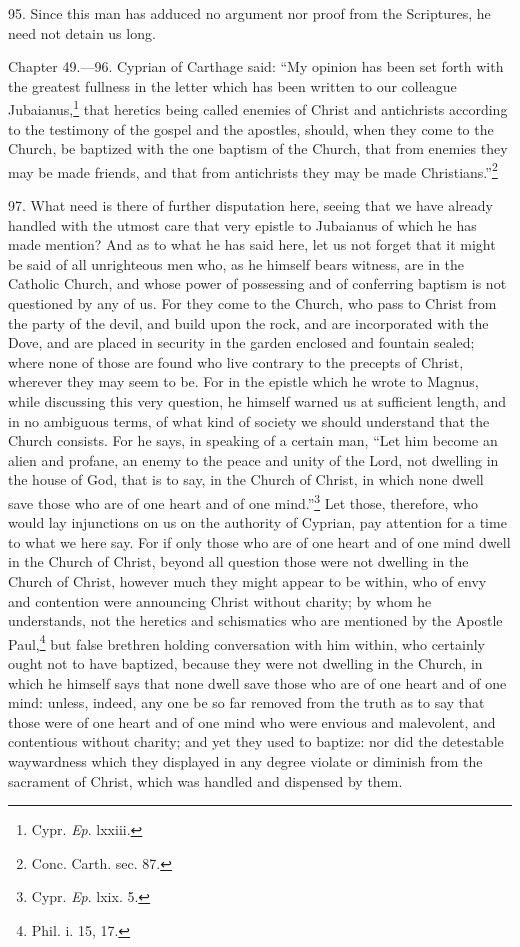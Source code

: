 95. Since this man has adduced no argument nor proof from the Scriptures, he need not detain us long.


Chapter 49.—96. Cyprian of Carthage said: ``My opinion has been set forth with the greatest fullness in the letter which has been written to our colleague Jubaianus,\footnote{\par  Cypr. \emph{Ep}. lxxiii.} that heretics being called enemies of Christ and antichrists according to the testimony of the gospel and the apostles, should, when they come to the Church, be baptized with the one baptism of the Church, that from enemies they may be made friends, and that from antichrists they may be made Christians.''\footnote{\par  Conc. Carth. sec. 87.}

97. What need is there of further disputation here, seeing that we have already handled with the utmost care that very epistle to Jubaianus of which he has made mention? And as to what he has said here, let us not forget that it might be said of all unrighteous men who, as he himself bears witness, are in the Catholic Church, and whose power of possessing and of conferring baptism is not questioned by any of us. For they come to the Church, who pass to Christ from the party of the devil, and build upon the rock, and are incorporated with the Dove, and are placed in security in the garden enclosed and fountain sealed; where none of those are found who live contrary to the precepts of Christ, wherever they may seem to be. For in the epistle which he wrote to Magnus, while discussing this very question, he himself warned us at sufficient length, and in no ambiguous terms, of what kind of society we should understand that the Church consists. For he says, in speaking of a certain man, ``Let him become an alien and profane, an enemy to the peace and unity of the Lord, not dwelling in the house of God, that is to say, in the Church of Christ, in which none dwell save those who are of one heart and of one mind.''\footnote{\par  Cypr. \emph{Ep}. lxix. 5.} Let those, therefore, who would lay injunctions on us on the authority of Cyprian, pay attention for a time to what we here say. For if only those who are of one heart and of one mind dwell in the Church of Christ, beyond all question those were not dwelling in the Church of Christ, however much they might appear to be within, who of envy and contention were announcing Christ without charity; by whom he understands, not the heretics and schismatics who are mentioned by the Apostle Paul,\footnote{\par  Phil. i. 15, 17.} but false brethren holding conversation with him within, who certainly ought not to have baptized, because they were not dwelling in the Church, in which he himself says that none dwell save those who are of one heart and of one mind: unless, indeed, any one be so far removed from the truth as to say that those were of one heart and of one mind who were envious and malevolent, and contentious without charity; and yet they used to baptize: nor did the detestable waywardness which they displayed in any degree violate or diminish from the sacrament of Christ, which was handled and dispensed by them.

